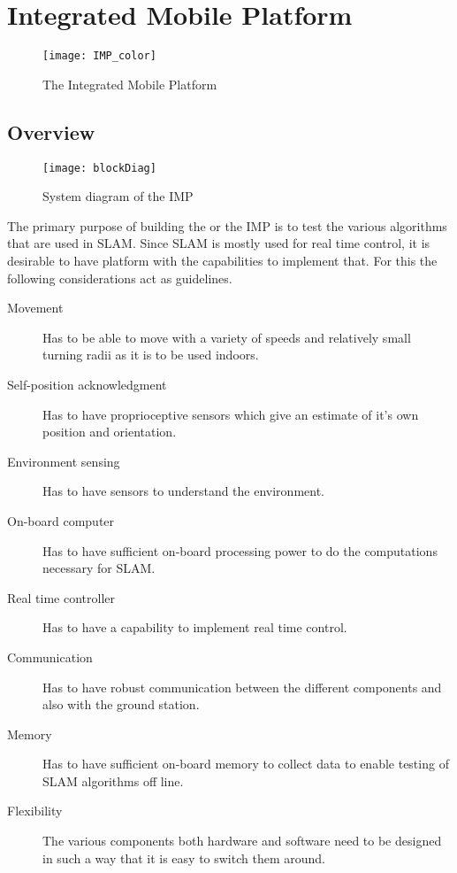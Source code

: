 \chapter{Integrated Mobile Platform}
\label{cha:Platform}

\begin{figure}
\centering
\texttt{[image: IMP\_color]}
\caption{The Integrated Mobile Platform}
\end{figure}

\section{Overview}
\begin{figure}
\centering
\texttt{[image: blockDiag]}
\caption{System diagram of the IMP}
\label{fig: blockDiag}
\end{figure}
The primary purpose of building the \imp or the IMP is to test the various algorithms that are used in SLAM. Since SLAM is mostly used for real time control, it is desirable to have platform with the capabilities to implement that. For this the following considerations act as guidelines.
\begin{description}
	\item[Movement] Has to be able to move with a variety of speeds and relatively small turning radii as it is to be used indoors. 
	\item[Self-position acknowledgment] Has to have proprioceptive sensors which give an estimate of it's own position and orientation.
	\item[Environment sensing] Has to have sensors to understand the environment. 
	\item[On-board computer] Has to have sufficient on-board processing power to do the computations necessary for SLAM.
	\item[Real time controller] Has to have a capability to implement real time control.
	\item[Communication] Has to have robust communication between the different components and also with the ground station. 
	\item[Memory] Has to have sufficient on-board memory to collect data to enable testing of SLAM algorithms off line.  
	\item[Flexibility] The various components both hardware and software need to be designed in such a way that it is easy to switch them around.
\end{description}

